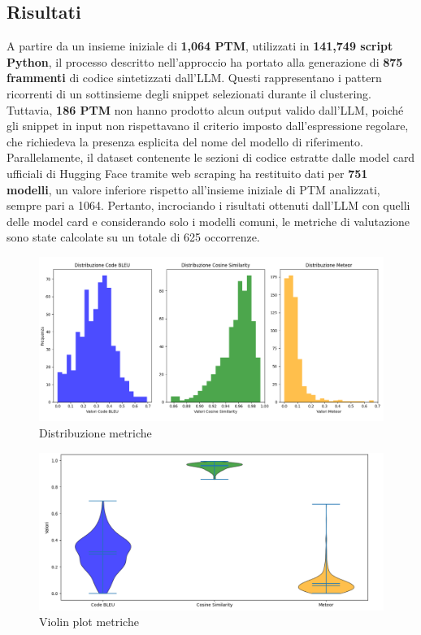 \documentclass{article}
\begin{document}
\subsection{Risultati}
A partire da un insieme iniziale di \textbf{1,064 PTM}, utilizzati in \textbf{141,749 script Python}, il processo descritto nell’approccio ha portato alla generazione di \textbf{875 frammenti} di codice sintetizzati dall’LLM. Questi rappresentano i pattern ricorrenti di un sottinsieme degli snippet selezionati durante il clustering. Tuttavia, \textbf{186 PTM} non hanno prodotto alcun output valido dall’LLM, poiché gli snippet in input non rispettavano il criterio imposto dall’espressione regolare, che richiedeva la presenza esplicita del nome del modello di riferimento.\\
Parallelamente, il dataset contenente le sezioni di codice estratte dalle model card ufficiali di Hugging Face tramite web scraping ha restituito dati per \textbf{751 modelli}, un valore inferiore rispetto all'insieme iniziale di PTM analizzati, sempre pari a 1064. Pertanto, incrociando i risultati ottenuti dall’LLM con quelli delle model card e considerando solo i modelli comuni, le metriche di valutazione sono state calcolate su un totale di 625 occorrenze.\\
\begin{figure}[htbp]
    \centering
    \includegraphics[width=\textwidth]{img/risultati1.png}
    \caption{Distribuzione metriche}
    \label{fig:risultati1}
\end{figure}
\begin{figure}[htbp]
    \centering
    \includegraphics[width=\textwidth]{img/risultati2.png}
    \caption{Violin plot metriche}
    \label{fig:risultati2}
\end{figure}
\end{document}
